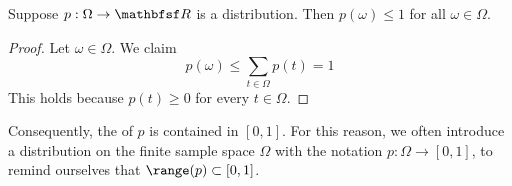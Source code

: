 \begin{proposition}
Suppose $p: \Omega  \to \R $ is a distribution.
Then $p(\omega ) \leq 1$ for all $\omega  \in \Omega $.
\begin{proof}Let $\omega  \in \Omega $.
We claim
\[
\textstyle
p(\omega ) \leq \sum_{t \in \Omega } p(t) = 1
\]
This holds because $p(t) \geq 0$ for every $t \in \Omega $.\end{proof}
\end{proposition}

Consequently, the of $p$ is contained in $[0,1]$.
For this reason, we often introduce a distribution on the finite sample space $\Omega $ with the notation $p: \Omega  \to [0,1]$, to remind ourselves that $\range(p) \subset [0,1]$.
